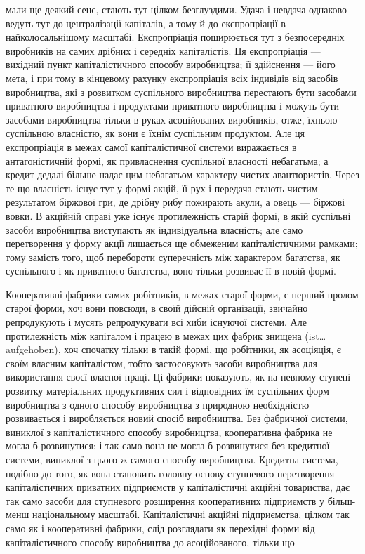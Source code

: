 \parcont{}  %
мали ще деякий сенс, стають тут цілком безглуздими. Удача
і невдача однаково ведуть тут до централізації капіталів,
а тому й до експропріації в найколосальнішому масштабі. Експропріація поширюється тут з
безпосередніх виробників на
самих дрібних і середніх капіталістів. Ця експропріація — вихідний пункт капіталістичного способу
виробництва; її здійснення — його мета, і при тому в кінцевому рахунку експропріація всіх індивідів
від засобів виробництва, які з розвитком
суспільного виробництва перестають бути засобами приватного
виробництва і продуктами приватного виробництва і можуть
бути засобами виробництва тільки в руках асоційованих виробників, отже, їхньою суспільною власністю,
як вони є їхнім суспільним
продуктом. Але ця експропріація в межах самої капіталістичної
системи виражається в антагоністичній формі, як привласнення
суспільної власності небагатьма; а кредит дедалі більше надає
цим небагатьом характеру чистих авантюристів. Через те що
власність існує тут у формі акцій, її рух і передача стають
чистим результатом біржової гри, де дрібну рибу пожирають
акули, а овець — біржові вовки. В акційній справі уже існує
протилежність старій формі, в якій суспільні засоби виробництва
виступають як індивідуальна власність; але само перетворення
у форму акції лишається ще обмеженим капіталістичними рамками; тому замість того, щоб перебороти
суперечність між
характером багатства, як суспільного і як приватного багатства, воно тільки розвиває її в новій
формі.

Кооперативні фабрики самих робітників, в межах старої
форми, є перший пролом старої форми, хоч вони повсюди,
в своїй дійсній організації, звичайно репродукують і мусять
репродукувати всі хиби існуючої системи. Але протилежність між
капіталом і працею в межах цих фабрик знищена (ist\dots{} aufgehoben),
хоч спочатку тільки в такій формі, що робітники, як асоціяція,
є своїм власним капіталістом, тобто застосовують засоби виробництва для використання своєї власної
праці. Ці фабрики показують, як на певному ступені розвитку матеріальних продуктивних сил і
відповідних їм суспільних форм виробництва з одного
способу виробництва з природною необхідністю розвивається і
виробляється новий спосіб виробництва. Без фабричної системи,
виниклої з капіталістичного способу виробництва, кооперативна фабрика не могла б розвинутися; і так
само вона не могла б
розвинутися без кредитної системи, виниклої з цього ж самого
способу виробництва. Кредитна система, подібно до того, як
вона становить головну основу ступневого перетворення капіталістичних приватних підприємств у
капіталістичні акційні товариства, дає так само засоби для ступневого розширення кооперативних
підприємств у більш-менш національному масштабі.
Капіталістичні акційні підприємства, цілком так само як і кооперативні фабрики, слід розглядати як
перехідні форми від капіталістичного способу виробництва до асоційованого, тільки що
\parbreak{}  %
